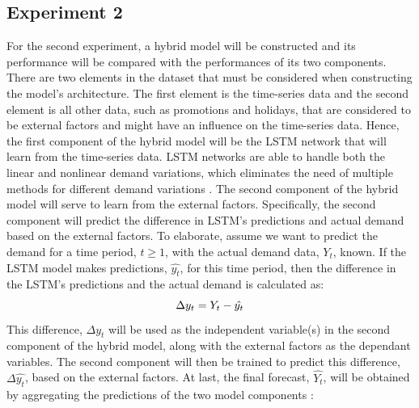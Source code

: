 \subsection*{Experiment 2}
\begin{figure}
    \vspace{-8.5mm}
    \label{fig:hyb_summary}
\end{figure}
For the second experiment, a hybrid model will be constructed and its performance will be compared with the performances of its two components.
There are two elements in the dataset that must be considered when constructing the model's architecture.
The first element is the time-series data and the second element is all other data, such as promotions and holidays, that are considered to be external factors and might have an influence on the time-series data.
Hence, the first component of the hybrid model will be the LSTM network that will learn from the time-series data. 
LSTM networks are able to handle both the linear and nonlinear demand variations, which eliminates the need of multiple methods for different demand variations \cite{c8}.
The second component of the hybrid model will serve to learn from the external factors. 
Specifically, the second component will predict the difference in LSTM's predictions and actual demand based on the external factors.
To elaborate, assume we want to predict the demand for a time period, \(t \geq 1\), with the actual demand data, \(Y_t\), known. 
If the LSTM model makes predictions, \(\hat{y_t}\), for this time period, then the difference in the LSTM's predictions and the actual demand is calculated as:
\[\Delta y_t = Y_t - \hat{y_t} \vspace{-2mm}\]
This difference, \(\Delta y_t\) will be used as the independent variable(s) in the second component of the hybrid model, along with the external factors as the dependant variables. The second component will then be trained to predict this difference, \(\Delta \hat{y_t}\), based on the external factors. At last, the final forecast, \(\hat{Y_t}\), will be obtained by aggregating the predictions of the two model components \cite{c8}:
